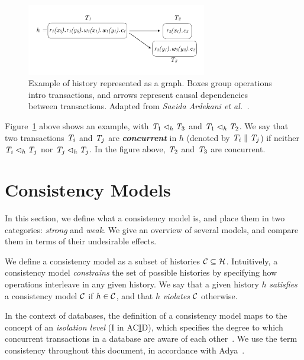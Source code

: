 \begin{figure}[h]
  \centering
  \vspace{-0.4cm}
  \includegraphics[width=0.7\textwidth]{figures/history.pdf}
  \vspace{-1cm}
  \caption{Example of history represented as a graph. Boxes group operations intro transactions, and arrows represent causal dependencies between transactions. Adapted from \em{Saeida Ardekani et al.~\citep{ardekani_nmsi}}.}
  \label{fig:history}
\end{figure}

Figure~\ref{fig:history} above shows an example, with $\mathit{T}_1 \lhd_h \mathit{T}_3$ and $\mathit{T}_1 \lhd_h \mathit{T}_2$. We say that two transactions $\mathit{T}_i$ and $\mathit{T}_j$ are \textbf{\em concurrent} in $h$ (denoted by $\mathit{T}_i \parallel \mathit{T}_j$) if neither $\mathit{T}_i \lhd_h \mathit{T}_j$ nor $\mathit{T}_j \lhd_h \mathit{T}_j$. In the figure above, $\mathit{T}_2$ and $\mathit{T}_3$ are concurrent.

\section{Consistency Models}

In this section, we define what a consistency model is, and place them in two categories: \emph{strong} and \emph{weak}. We give an overview of several models, and compare them in terms of their undesirable effects.

We define a consistency model as a subset of histories $\mathcal{C} \subseteq \mathcal{H}$. Intuitively, a consistency model \emph{constrains} the set of possible histories by specifying how operations interleave in any given history. We say that a given history $h$ \emph{satisfies} a consistency model $\mathcal{C}$ if $h \in \mathcal{C}$, and that $h$ \emph{violates} $\mathcal{C}$ otherwise.

In the context of databases, the definition of a consistency model maps to the concept of an \emph{isolation level} (I in AC\underline{I}D), which specifies the degree to which concurrent transactions in a database are aware of each other~\citep{adya_thesis}. We use the term consistency throughout this document, in accordance with Adya~\citep{adya_thesis}.

